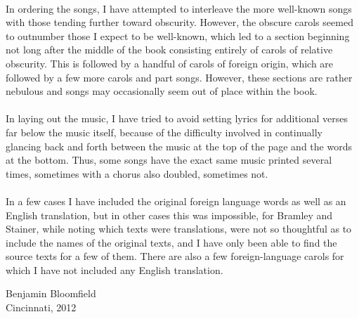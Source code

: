 \documentclass[letterpaper,12pt]{book} %
\begin{document}
\\
In ordering the songs, I have attempted to interleave the more well-known songs with those tending further toward obscurity.  However, the obscure carols seemed to outnumber those I expect to be well-known, which led to a section beginning not long after the middle of the book consisting entirely of carols of relative obscurity.  This is followed by a handful of carols of foreign origin, which are followed by a few more carols and part songs.  However, these sections are rather nebulous and songs may occasionally seem out of place within the book.\\
\\
In laying out the music, I have tried to avoid setting lyrics for additional verses far below the music itself, because of the difficulty involved in continually glancing back and forth between the music at the top of the page and the words at the bottom.  Thus, some songs have the exact same music printed several times, sometimes with a chorus also doubled, sometimes not.\\
\\
In a few cases I have included the original foreign language words as well as an English translation, but in other cases this was impossible, for Bramley and Stainer, while noting which texts were translations, were not so thoughtful as to include the names of the original texts, and I have only been able to find the source texts for a few of them.  There are also a few foreign-language carols for which I have not included any English translation.\\

\begin{flushright}
Benjamin Bloomfield\\
Cincinnati, 2012
\end{flushright}
\end{document}
